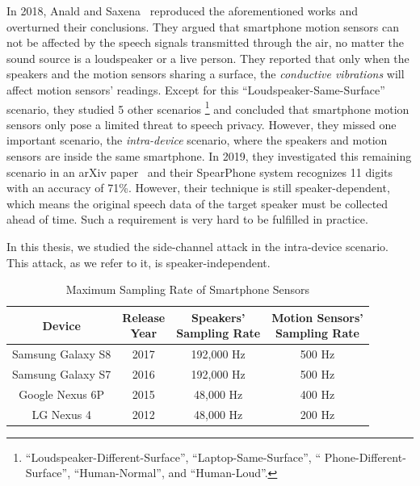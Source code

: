In 2018, Anald and Saxena~\cite{anand2018speechless} reproduced the aforementioned works and overturned their conclusions. They argued that smartphone motion sensors can not be affected by the speech signals transmitted through the air, no matter the sound source is a loudspeaker or a live person. They reported that only when the speakers and the motion sensors sharing a surface,  the \textit{conductive vibrations} will affect motion sensors' readings. Except for this ``Loudspeaker-Same-Surface'' scenario, they studied 5 other  scenarios
\footnote{\scriptsize``Loudspeaker-Different-Surface'', ``Laptop-Same-Surface'', `` Phone-Different-Surface'', 		``Human-Normal'', and ``Human-Loud''.}  
and concluded that smartphone motion sensors only pose a limited threat to speech privacy.
%
However, they missed one important scenario,  the \textit{intra-device} scenario, where the speakers and motion sensors are inside the same smartphone. In 2019, they investigated this remaining scenario in an arXiv paper~\cite{anand2019spearphone} and their SpearPhone system recognizes 11 digits with an accuracy of 71\%.  However, their technique is still speaker-dependent, which means the original speech data of the target speaker must be collected ahead of time. Such a requirement is very hard to be fulfilled in practice.

In this thesis, we studied the side-channel attack in the intra-device scenario. This \textit{{\attackName}} attack, as we refer to it, is speaker-independent.


\begin{table}[h]
	\caption{Maximum Sampling Rate of Smartphone Sensors}
	\label{tab:sample}
	\centering
	
	\begin{tabular}{cccc} %
		\toprule		
		Device & \makecell{Release \\Year} & \makecell{Speakers' \\ Sampling Rate} & \makecell{Motion Sensors' \\ Sampling Rate
			\footnotemark} \\
		\midrule
		Samsung Galaxy S8 & 2017 & 192,000 Hz & 500 Hz\\
		Samsung Galaxy S7 & 2016 & 192,000 Hz & 500 Hz\\		
		Google Nexus 6P & 2015 & 48,000 Hz & 400 Hz\\
		LG Nexus 4 & 2012 & 48,000 Hz& 200 Hz\\
		\bottomrule
	\end{tabular}
\end{table}



